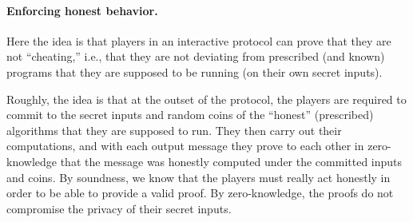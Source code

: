 \documentclass[11pt]{article}
\begin{document}
\paragraph{Enforcing honest behavior.}

Here the idea is that players in an interactive protocol can prove
that they are not ``cheating,'' i.e., that they are not deviating from
prescribed (and known) programs that they are supposed to be running
(on their own secret inputs).

Roughly, the idea is that at the outset of the protocol, the players
are required to commit to the secret inputs and random coins of the
``honest'' (prescribed) algorithms that they are supposed to run.
They then carry out their computations, and with each output message
they prove to each other in zero-knowledge that the message was
honestly computed under the committed inputs and coins.  By soundness,
we know that the players must really act honestly in order to be able
to provide a valid proof.  By zero-knowledge, the proofs do not
compromise the privacy of their secret inputs.
\end{document}

